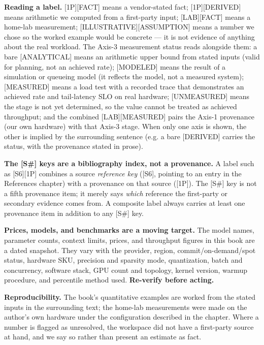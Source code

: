 \medskip
\noindent\textbf{Reading a label.} \textsc{[1P][FACT]} means a vendor-stated fact; \textsc{[1P][DERIVED]} means arithmetic we computed from a first-party input; \textsc{[LAB][FACT]} means a home-lab measurement; \textsc{[ILLUSTRATIVE][ASSUMPTION]} means a number we chose so the worked example would be concrete — it is not evidence of anything about the real workload. The Axis-3 measurement status reads alongside them: a bare \textsc{[ANALYTICAL]} means an arithmetic upper bound from stated inputs (valid for planning, not an achieved rate); \textsc{[MODELED]} means the result of a simulation or queueing model (it reflects the model, not a measured system); \textsc{[MEASURED]} means a load test with a recorded trace that demonstrates an achieved rate and tail-latency SLO on real hardware; \textsc{[UNMEASURED]} means the stage is not yet determined, so the value cannot be treated as achieved throughput; and the combined \textsc{[LAB][MEASURED]} pairs the Axis-1 provenance (our own hardware) with that Axis-3 stage. When only one axis is shown, the other is implied by the surrounding sentence (e.g. a bare \textsc{[DERIVED]} carries the status, with the provenance stated in prose).

\noindent\textbf{The \textsc{[S\#]} keys are a bibliography index, not a provenance.} A label such as \textsc{[S6][1P]} combines a source \emph{reference key} (\textsc{[S6]}, pointing to an entry in the References chapter) with a provenance on that source (\textsc{[1P]}). The \textsc{[S\#]} key is not a fifth provenance item; it merely says \emph{which} reference the first-party or secondary evidence comes from. A composite label always carries at least one provenance item in addition to any \textsc{[S\#]} key.

\noindent\textbf{Prices, models, and benchmarks are a moving target.} The model names, parameter counts, context limits, prices, and throughput figures in this book are a dated snapshot. They vary with the provider, region, commit/on-demand/spot status, hardware SKU, precision and sparsity mode, quantization, batch and concurrency, software stack, GPU count and topology, kernel version, warmup procedure, and percentile method used. \textbf{Re-verify before acting.}

\noindent\textbf{Reproducibility.} The book's quantitative examples are worked from the stated inputs in the surrounding text; the home-lab measurements were made on the author's own hardware under the configuration described in the chapter. Where a number is flagged as unresolved, the workspace did not have a first-party source at hand, and we say so rather than present an estimate as fact.

